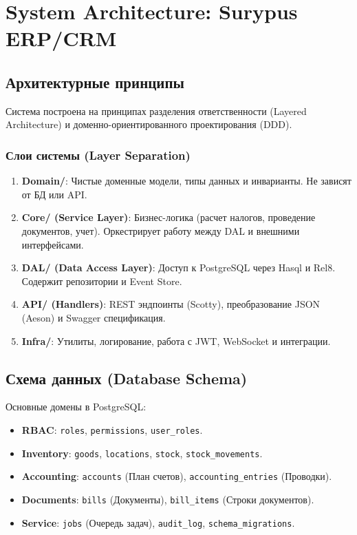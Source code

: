 \chapter{System Architecture: Surypus
ERP/CRM}\label{system-architecture-surypus-erpcrm}

\section{Архитектурные
принципы}\label{ux430ux440ux445ux438ux442ux435ux43aux442ux443ux440ux43dux44bux435-ux43fux440ux438ux43dux446ux438ux43fux44b}

Система построена на принципах разделения ответственности (Layered
Architecture) и доменно-ориентированного проектирования (DDD).

\subsection{Слои системы (Layer
Separation)}\label{ux441ux43bux43eux438-ux441ux438ux441ux442ux435ux43cux44b-layer-separation}

\begin{enumerate}
\def\labelenumi{\arabic{enumi}.}
\tightlist
\item
  \textbf{Domain/}: Чистые доменные модели, типы данных и инварианты. Не
  зависят от БД или API.
\item
  \textbf{Core/ (Service Layer)}: Бизнес-логика (расчет налогов,
  проведение документов, учет). Оркестрирует работу между DAL и внешними
  интерфейсами.
\item
  \textbf{DAL/ (Data Access Layer)}: Доступ к PostgreSQL через Hasql и
  Rel8. Содержит репозитории и Event Store.
\item
  \textbf{API/ (Handlers)}: REST эндпоинты (Scotty), преобразование JSON
  (Aeson) и Swagger спецификация.
\item
  \textbf{Infra/}: Утилиты, логирование, работа с JWT, WebSocket и
  интеграции.
\end{enumerate}

\section{Схема данных (Database
Schema)}\label{ux441ux445ux435ux43cux430-ux434ux430ux43dux43dux44bux445-database-schema}

Основные домены в PostgreSQL:

\begin{itemize}
\tightlist
\item
  \textbf{RBAC}: \texttt{roles}, \texttt{permissions},
  \texttt{user\_roles}.
\item
  \textbf{Inventory}: \texttt{goods}, \texttt{locations},
  \texttt{stock}, \texttt{stock\_movements}.
\item
  \textbf{Accounting}: \texttt{accounts} (План счетов),
  \texttt{accounting\_entries} (Проводки).
\item
  \textbf{Documents}: \texttt{bills} (Документы), \texttt{bill\_items}
  (Строки документов).
\item
  \textbf{Service}: \texttt{jobs} (Очередь задач), \texttt{audit\_log},
  \texttt{schema\_migrations}.
\end{itemize}

